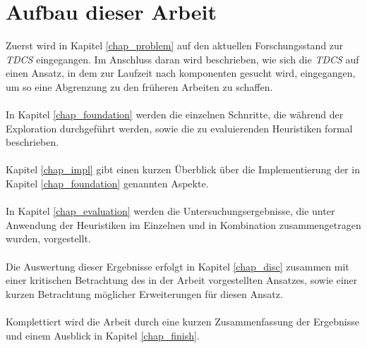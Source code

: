\section{Aufbau dieser Arbeit}
Zuerst wird in Kapitel \ref{chap_problem} auf den aktuellen Forschungsstand zur \emph{TDCS} eingegangen. Im Anschluss daran wird beschrieben, wie sich die \emph{TDCS} auf einen Ansatz, in dem zur Laufzeit nach \gls{komponente}n gesucht wird, eingegangen, um so eine Abgrenzung zu den früheren Arbeiten zu schaffen.
\\\\
In Kapitel \ref{chap_foundation} werden die einzelnen Schnritte, die während der Exploration durchgeführt werden, sowie die zu evaluierenden \Gls{Heuristik}en formal beschrieben.
\\\\
Kapitel \ref{chap_impl} gibt einen kurzen Überblick über die Implementierung der in Kapitel \ref{chap_foundation} genannten Aspekte.
\\\\
In Kapitel \ref{chap_evaluation} werden die Untersuchungsergebnisse, die unter Anwendung der \Gls{Heuristik}en im Einzelnen und in Kombination zusammengetragen wurden, vorgestellt. 
\\\\
Die Auswertung dieser Ergebnisse erfolgt in Kapitel \ref{chap_disc} zusammen mit einer kritischen Betrachtung des in der Arbeit vorgestellten Ansatzes, sowie einer kurzen Betrachtung möglicher Erweiterungen für diesen Ansatz.
\\\\
Komplettiert wird die Arbeit durch eine kurzen Zusammenfassung der Ergebnisse und einem Ausblick in Kapitel \ref{chap_finish}.
%